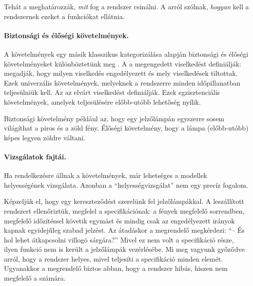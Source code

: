 \begin{megjegyzes}
Tehát a  meghatározzák, \emph{mit} fog a rendszer csinálni. A  arról szólnak, \emph{hogyan} kell a rendszernek ezeket a funkciókat ellátnia.
\end{megjegyzes}

\paragraph{Biztonsági és élőségi követelmények.}
A követelmények egy másik klasszikus kategorizálása alapján biztonsági és élőségi követelményeket különböztetünk meg \cite{Lamport:1977}.
A  a megengedett viselkedést definiálják: megadják, hogy milyen viselkedés engedélyezett és mely viselkedések tiltottak. Ezek univerzális követelmények, melyeknek a rendszerre minden időpillanatban teljesülniük kell.
Az  az elvárt viselkedést definiálják.
Ezek egzisztenciális követelmények, amelyek teljesülésére előbb-utóbb lehetőség nyílik.

\begin{megjegyzes}
Biztonsági követelmény például az, hogy egy jelzőlámpán egyszerre sosem világíthat a piros és a zöld fény. Élőségi követelmény, hogy a lámpa (előbb-utóbb) képes legyen zöldre váltani.
\end{megjegyzes}


\paragraph{Vizsgálatok fajtái.}
Ha rendelkezésre állnak a követelmények, már lehetséges a modellek helyességének vizsgálata. Azonban a ``helyességvizsgálat'' nem egy precíz fogalom. 

\begin{megjegyzes}
Képzeljük el, hogy egy kereszteződést szerelünk fel jelzőlámpákkal. A leszállított rendszert ellenőriztük, megfelel a specifikációnak: a fények megfelelő sorrendben, megfelelő időzítéssel követik egymást és mindig csak az engedélyezett irányok kapnak egyidejűleg szabad jelzést. Az átadáskor a megrendelő megkérdezi: ``-- És hol lehet átkapcsolni villogó sárgára?'' Mivel ez nem volt a specifikáció része, ilyen funkció nem is került a jelzőlámpák vezérlésébe. Mi meg vagyunk győződve arról, hogy a rendszer helyes, mivel teljesíti a specifikáció minden elemét. Ugyanakkor a megrendelő biztos abban, hogy a rendszer hibás, hiszen nem megfelelő a számára.
\end{megjegyzes}

